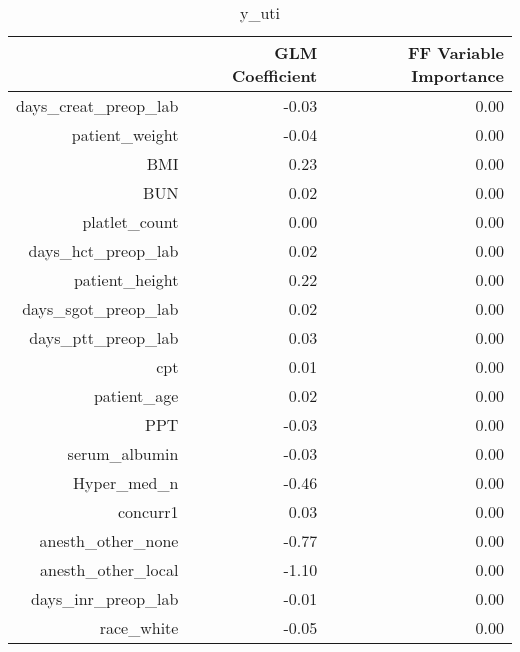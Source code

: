 \begin{table}[ht]
\centering
\begin{tabular}{rrr}
  \hline
 & GLM Coefficient & FF Variable Importance \\ 
  \hline
days\_creat\_preop\_lab & -0.03 & 0.00 \\ 
  patient\_weight & -0.04 & 0.00 \\ 
  BMI & 0.23 & 0.00 \\ 
  BUN & 0.02 & 0.00 \\ 
  platlet\_count & 0.00 & 0.00 \\ 
  days\_hct\_preop\_lab & 0.02 & 0.00 \\ 
  patient\_height & 0.22 & 0.00 \\ 
  days\_sgot\_preop\_lab & 0.02 & 0.00 \\ 
  days\_ptt\_preop\_lab & 0.03 & 0.00 \\ 
  cpt & 0.01 & 0.00 \\ 
  patient\_age & 0.02 & 0.00 \\ 
  PPT & -0.03 & 0.00 \\ 
  serum\_albumin & -0.03 & 0.00 \\ 
  Hyper\_med\_n & -0.46 & 0.00 \\ 
  concurr1 & 0.03 & 0.00 \\ 
  anesth\_other\_none & -0.77 & 0.00 \\ 
  anesth\_other\_local & -1.10 & 0.00 \\ 
  days\_inr\_preop\_lab & -0.01 & 0.00 \\ 
  race\_white & -0.05 & 0.00 \\ 
   \hline
\end{tabular}
\caption{y_uti} 
\end{table}

